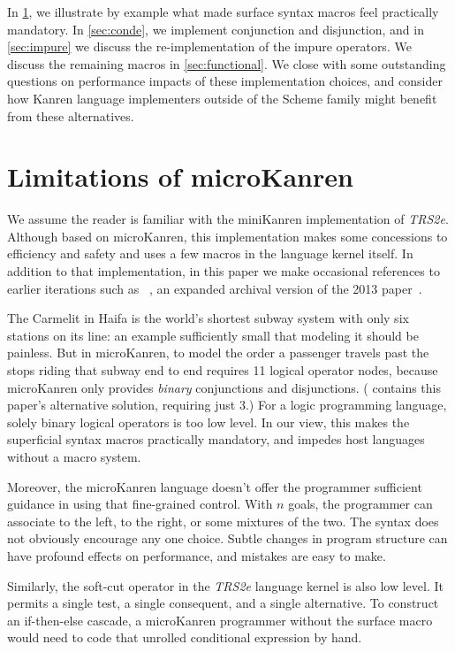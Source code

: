 \documentclass[sigplan,balance=true,pbalance=true,natbib=false]{acmart}
\begin{document}
In \cref{sec:all-aboard}, we illustrate by example what made surface
syntax macros feel practically mandatory. In \cref{sec:conde}, we
implement conjunction and disjunction, and in \cref{sec:impure} we
discuss the re-implementation of the impure operators. We discuss the
remaining macros in \cref{sec:functional}. We close with some
outstanding questions on performance impacts of these implementation
choices, and consider how Kanren language implementers outside of the
Scheme family might benefit from these alternatives.

\section{Limitations of microKanren}\label{sec:all-aboard}

We assume the reader is familiar with the miniKanren implementation of
\emph{TRS2e}. Although based on microKanren, this implementation makes
some concessions to efficiency and safety and uses a few macros in the
language kernel itself. In addition to that implementation, in this
paper we make occasional references to earlier iterations such as
\citeauthor{hemann2016small}~\cite{hemann2016small}, an expanded
archival version of the 2013 paper~\cite{hemann2013muKanren}.

The Carmelit in Haifa is the world's shortest subway system with only
six stations on its line: an example sufficiently small that modeling
it should be painless. But in microKanren, to model the order a
passenger travels past the stops riding that subway end to end
requires 11 logical operator nodes, because microKanren only provides
\emph{binary} conjunctions and disjunctions. (
contains this paper's alternative solution, requiring just 3.) For a
logic programming language, solely binary logical operators is too low
level. In our view, this makes the superficial syntax macros
practically mandatory, and impedes host languages without a macro
system.

Moreover, the microKanren language doesn't offer the programmer
sufficient guidance in using that fine-grained control. With $n$
goals, the programmer can associate to the left, to the right, or some
mixtures of the two. The syntax does not obviously encourage any one
choice. Subtle changes in program structure can have profound effects
on performance, and mistakes are easy to make.

Similarly, the soft-cut operator  in the \emph{TRS2e}
language kernel is also low level. It permits a single test, a single
consequent, and a single alternative. To construct an if-then-else
cascade, a microKanren programmer without the 
surface macro would need to code that unrolled conditional expression
by hand.
\end{document}
